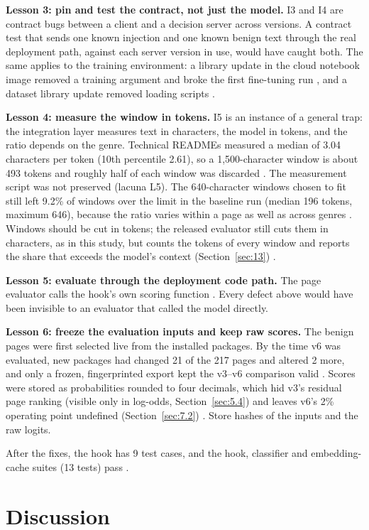 \documentclass[11pt]{article}
\begin{document}
\textbf{Lesson 3: pin and test the contract, not just the model.} I3 and I4 are contract bugs between a client and a decision server across versions. A contract test that sends one known injection and one known benign text through the real deployment path, against each server version in use, would have caught both. The same applies to the training environment: a library update in the cloud notebook image removed a training argument and broke the first fine-tuning run%
, and a dataset library update removed loading scripts%
.

\textbf{Lesson 4: measure the window in tokens.} I5 is an instance of a general trap: the integration layer measures text in characters, the model in tokens, and the ratio depends on the genre. Technical READMEs measured a median of 3.04 characters per token (10th percentile 2.61), so a 1,500-character window is about 493 tokens and roughly half of each window was discarded%
. The measurement script was not preserved (lacuna L5). The 640-character windows chosen to fit still left 9.2\% of windows over the limit in the baseline run (median 196 tokens, maximum 646), because the ratio varies within a page as well as across genres%
. Windows should be cut in tokens; the released evaluator still cuts them in characters, as in this study, but counts the tokens of every window and reports the share that exceeds the model's context (Section~\ref{sec:13})%
.

\textbf{Lesson 5: evaluate through the deployment code path.} The page evaluator calls the hook's own scoring function%
. Every defect above would have been invisible to an evaluator that called the model directly.

\textbf{Lesson 6: freeze the evaluation inputs and keep raw scores.} The benign pages were first selected live from the installed packages. By the time v6 was evaluated, new packages had changed 21 of the 217 pages and altered 2 more, and only a frozen, fingerprinted export kept the v3–v6 comparison valid%
. Scores were stored as probabilities rounded to four decimals, which hid v3's residual page ranking (visible only in log-odds, Section~\ref{sec:5.4}) and leaves v6's 2\% operating point undefined (Section~\ref{sec:7.2})%
. Store hashes of the inputs and the raw logits.

After the fixes, the hook has 9 test cases, and the hook, classifier and embedding-cache suites (13 tests) pass%
.

\section{Discussion}\label{sec:9}
\end{document}
